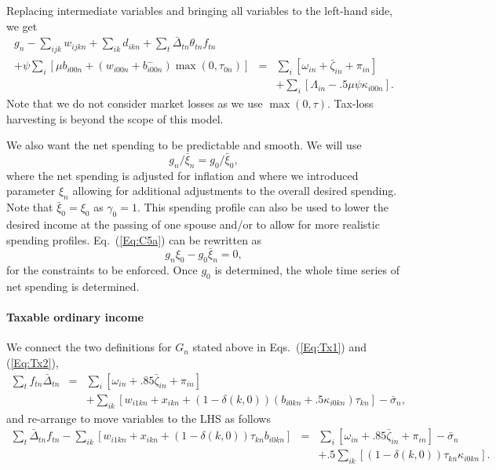 \documentclass{article}[fleqn,12pt]
\begin{document}
	Replacing intermediate variables and bringing all variables to the left-hand side, we get
	\begin{eqnarray}
		\label{Eq:C4}
		g_n - \sum_{ijk} w_{ijkn} + \sum_{ik}d_{ikn}
		+ \sum_t \bar{\Delta}_{t n}\theta_{t n} f_{t n}&&\nonumber \\
		+ \psi \sum_{i} \left[\mu b_{i00n} + (w_{i00n} + b^-_{i00n})
		\max(0, \tau_{0n})\right] 
		&= & \sum_i [\omega_{in} + \bar{\zeta}_{in} + \pi_{in} ] \nonumber\\
		&& + \sum_i [\Lambda_{in} - .5\mu\psi\kappa_{i00n}].
	\end{eqnarray}
	Note that we do not consider market losses as we use $\max(0, \tau)$. Tax-loss
	harvesting is beyond the scope of this model.

	We also want the net spending to be predictable and smooth. We will use
\begin{equation}
	\label{Eq:C5a}
	g_{n}/\bar{\xi}_{n} = g_0/\bar{\xi}_0,
\end{equation}
where the net spending is adjusted for inflation and where we introduced parameter $\xi_n$ 
allowing for additional adjustments to the overall desired spending.
Note that $\bar{\xi}_0 = \xi_0$ as $\gamma_0=1$.
This spending profile can also be used to lower the desired income at the passing
of one spouse and/or to allow for more realistic spending profiles.
Eq.~(\ref{Eq:C5a}) can be rewritten as
\begin{equation}
	\label{Eq:C5}
	g_n \xi_0 - g_0 \bar{\xi}_n = 0,
\end{equation}
for the constraints to be enforced. Once $g_0$ is determined, the whole time series of net spending
is determined.

\paragraph*{Taxable ordinary income}
	We connect the two definitions for $G_n$ stated above in Eqs.~(\ref{Eq:Tx1}) and (\ref{Eq:Tx2}),
	\begin{eqnarray}
		\sum_t f_{t n}\bar{\Delta}_{t n} &=&
		\sum_i [\omega_{in} + .85\bar\zeta_{in} + \pi_{in}]  \nonumber \\
		&& + \sum_{ik} [w_{i1kn} + x_{ikn} + (1 - \delta(k, 0))(b_{i0kn} +
		.5\kappa_{i0kn})\tau_{kn}] - \bar{\sigma}_n,
	\end{eqnarray}
	and re-arrange to move variables to the LHS as follows
	\begin{eqnarray}
		\label{Eq:C6}
		\sum_t \bar{\Delta}_{t n} f_{t n}
		- \sum_{ik} [
			w_{i1kn} + x_{ikn} +
			(1 - \delta(k, 0))\tau_{kn}b_{i0kn}] &=&
		\sum_i [\omega_{in} + .85\bar\zeta_{in} + \pi_{in} ] 
		- \bar{\sigma}_n
		\nonumber \\
		&& + .5\sum_{ik} [(1-\delta(k, 0))\tau_{kn}\kappa_{i0kn}].
	\end{eqnarray}
\end{document}
